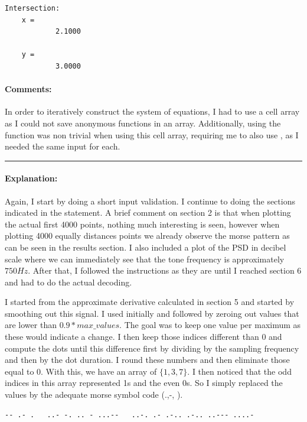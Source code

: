 \begin{verbatim}
Intersection:
    x =
            2.1000

    y =
            3.0000
\end{verbatim}

\paragraph{Comments:}
In order to iteratively construct the system of equations, I had to
use a cell array as I could not save anonymous functions in an array.
Additionally, using the  function was non trivial when
using this cell array, requiring me to also use , as
I needed the same input for each.

\bigskip
\hrule


\paragraph{Explanation:}
Again, I start by doing a short input validation.
I continue to doing the sections indicated in the statement.
A brief comment on section 2 is that when plotting the actual first
4000 points, nothing much interesting is seen, however when plotting
4000 equally distances points we already observe the morse pattern as
can be seen in the results section.
I also included a plot of the PSD in decibel scale where we can
immediately see that the tone frequency is approximately $ 750Hz $.
After that, I followed the instructions as they are until I reached
section 6 and had to do the actual decoding.

I started from the approximate derivative calculated in section 5 and
started by smoothing out this signal.
I used  initially and followed by zeroing out
values that are lower than $ 0.9 * max\_values $.
The goal was to keep one value per maximum as these would indicate a change.
I then keep those indices different than 0 and compute the dots
until this difference first by dividing by the sampling frequency and
then by the dot duration.
I round these numbers and then eliminate those equal to 0.
With this, we have an array of $ \{1, 3, 7\} $.
I then noticed that the odd indices in this array represented 1s and
the even 0s.
So I simply replaced the values by the adequate morse symbol code (.,-, ).

\begin{verbatim}
-- .- .   ..- -. .. - ...--   ..-. .- .-.. .-.. ..--- ....-
\end{verbatim}

